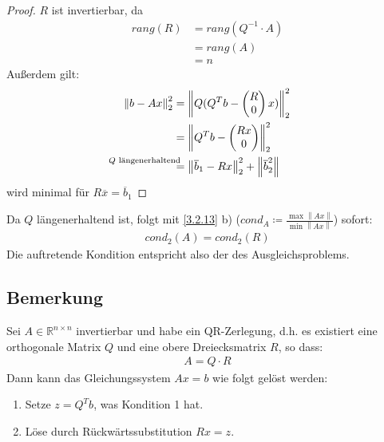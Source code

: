\documentclass[ngerman,fontsize=11pt, paper=a4, parskip=half, titlepage=true, toc=bib]{scrbook}
\newcommand{\Renn}{\mathds{R}^{n\times n}}
\newcommand{\nn}[1]{\left\| #1 \right\|}
\begin{document}
	 \begin{proof} $R$ ist invertierbar, da 
	 \begin{align*}
	 	rang(R) &= rang(Q^{-1}\cdot A) \\	
	 				& = rang(A) \\
	 				&= n
	 \end{align*}
	 Außerdem gilt:
	 \begin{align*}
	 	\nn{b-Ax}_2^2 & = \nn{Q(Q^Tb-\begin{pmatrix}R\\0\end{pmatrix}x)}_2^2 \\
	 							&=  \nn{Q^Tb-\begin{pmatrix}Rx\\0\end{pmatrix}}_2^2  \\
	 							&\overset{\mathllap{\text{$Q$ längenerhaltend}}}{=}
	 							   \nn{\overline{b}_1 - Rx}_2^2  + \nn{\overline{b}_2^2}
	 \end{align*}
	 wird minimal für $R\overline{x} = \overline{b}_1$
	\end{proof}
	 
	 Da $Q$ längenerhaltend ist, folgt mit \ref{3.2.13} b)
	 ($cond_A \coloneqq \frac{\max \nn{Ax}}{\min \nn{Ax}}$)
	 sofort:
	 \begin{gather*}
	 	cond_2(A) = cond_2(R)
	 \end{gather*}
	Die auftretende Kondition entspricht also der des Ausgleichsproblems.
	
	
	\subsection{Bemerkung}
	Sei $A\in \Renn$ invertierbar und habe ein QR-Zerlegung, d.h. es existiert
	eine orthogonale Matrix $Q$ und eine obere Dreiecksmatrix $R$, so dass:
	\begin{gather*}
		A= Q\cdot R
	\end{gather*}
	Dann kann das Gleichungssystem $Ax=b$ wie folgt gelöst werden:
	\begin{enumerate}[1.]
		\item Setze $z=Q^Tb$, was Kondition 1 hat.
		\item Löse durch Rückwärtssubstitution $Rx=z$.
	\end{enumerate}
	
		
\end{document}
